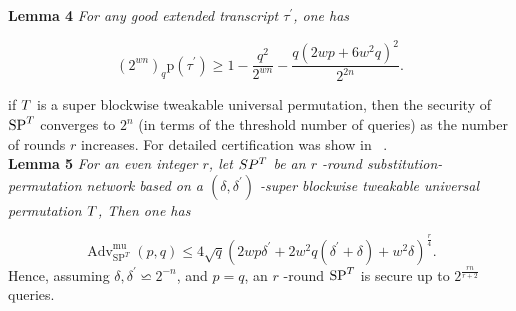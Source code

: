 \noindent \textbf{Lemma 4} \emph{For any good extended transcript $\tau^{\prime}$, one has}

$$
\left(2^{w n}\right)_{q} \mathrm{p}\left(\tau^{\prime}\right) \geq 1-\frac{q^{2}}{2^{w n}}-\frac{q\left(2 w p+6 w^{2} q\right)^{2}}{2^{2 n}}.
$$

if $\mathnormal{T}$ is a super blockwise tweakable universal permutation, then the security of $\operatorname{SP}^{\mathnormal{T}}$ converges to $2^n$ (in terms of the threshold number of queries) as the number of rounds $\mathit{r}$ increases. For detailed certification was show in ~\cite{cogliati2018wide}.\\

\noindent \textbf{Lemma 5} \emph{For an even integer $\mathit{r}$, let $SP^{\mathnormal{T}}$ be an $\mathit{r}$ -round substitution-permutation network based on a $(\delta, \delta^{\prime})$ -super blockwise tweakable universal permutation $\mathnormal{T}$, Then one has}

$$
\operatorname{Adv}_{\mathrm{SP}^{T}}^{\operatorname{mu}}(p, q) \leq 4 \sqrt{q}\left(2 w p \delta^{\prime}+2 w^{2} q\left(\delta^{\prime}+\delta\right)+w^{2} \delta\right)^{\frac{r}{4}}.
$$
Hence, assuming $\delta, \delta^{\prime} \backsimeq 2^{-n}$, and $p = q$, an $\mathit{r}$ -round $\operatorname{SP}^{\mathnormal{T}}$ is secure up to $2^{\frac{r n}{r+2}}$ queries.

